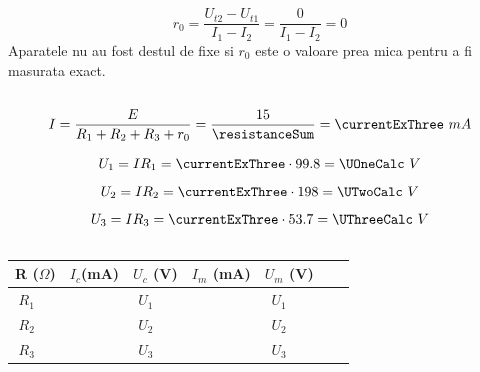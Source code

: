 \documentclass{article}
\begin{document}
		\subsection{}
			\[
				r_0 = \frac{U_{t2} - U_{t1}}{I_1 - I_2} = \frac{0}{I_1 - I_2} = 0
			\]
			Aparatele nu au fost destul de fixe si $r_0$ este o valoare prea mica pentru a fi masurata exact.

		\subsection{}



			\[
				I = \frac{E}{R_1 + R_2 + R_3 + r_0} = \frac{15}{\resistanceSum} = \currentExThree \ mA
			\]
			



			\[U_1 = IR_1 = \currentExThree \cdot \ROne = \UOneCalc \ V\]
			\[U_2 = IR_2 = \currentExThree \cdot \RTwo = \UTwoCalc \ V\]
			\[U_3 = IR_3 = \currentExThree \cdot \RThree = \UThreeCalc \ V\]

		\subsection{}
			\begin{center} \begin{tabular}{|c|c|c|c|c|c|c|c|c|c|}
				\hline
				\multicolumn{2}{|c|}{R ($\Omega$)} &$
					I_{c}$(mA) &
					\multicolumn{2}{c|}{$U_c$ (V)} &
					$I_{m}$ (mA) &
					\multicolumn{2}{c|}{$U_m$ (V)} \\

				\hline
				
				$R_1$ & \ROne &
					\multirow{3}{*}{\currentExThree} &
					$U_1$ & \UOneCalc &
					\multirow{3}{*}{\IPosOne} &
					$U_1$ & \UExOneOne\\
				
				\cline{1-2} \cline{4-5} \cline{7-8}

				$R_2$ & \RTwo & & $U_2$ & \UTwoCalc & & $U_2$ & \UExOneTwo\\		
				\cline{1-2} \cline{4-5} \cline{7-8}
				
				$R_3$ & \RThree & & $U_3$ & \UThreeCalc & & $U_3$ & \UExOneThree\\
				\hline
			\end{tabular} \end{center}
\end{document}
